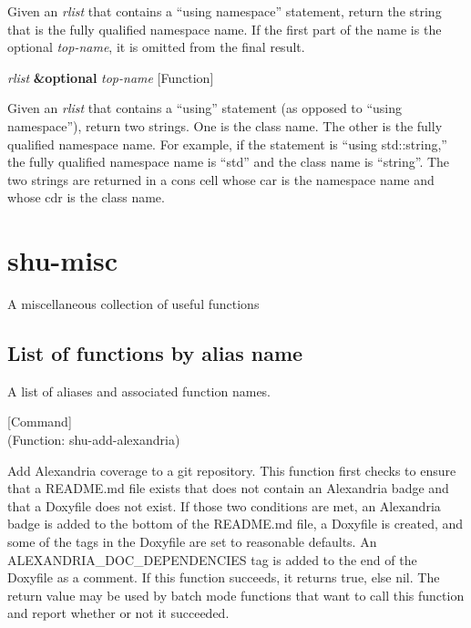 \begin{doc-string}
Given an \emph{rlist} that contains a ``using namespace'' statement, return the string
that is the fully qualified namespace name.  If the first part of the name is the
optional \emph{top-name}, it is omitted from the final result.
\end{doc-string}

\vspace{1em}
\noindent
{}
\usebox{\funcname}\emph{rlist} \textbf{\&optional} \emph{top-name}
 \hfill [Function]

\begin{doc-string}
Given an \emph{rlist} that contains a ``using'' statement (as opposed to ``using
namespace''), return two strings.  One is the class name.  The other is the
fully qualified namespace name.  For example, if the statement is ``using
std::string,'' the fully qualified namespace name is ``std'' and the class name
is ``string''.
The two strings are returned in a cons cell whose car is the namespace name and
whose cdr is the class name.
\end{doc-string}

\eject
\section{shu-misc}



A miscellaneous collection of useful functions


\subsection{List of functions by alias name}

A list of aliases and associated function names.



\vspace{1em}
\noindent
{}
\usebox{\funcname}
 \hfill [Command]\\%
 (Function: shu-add-alexandria)

\begin{doc-string}
Add Alexandria coverage to a git repository.
This function first checks to ensure that a README.md file exists that does not
contain an Alexandria badge and that a Doxyfile does not exist.  If those two
conditions are met, an Alexandria badge is added to the bottom of the README.md
file, a Doxyfile is created, and some of the tags in the Doxyfile are set to
reasonable defaults.  An ALEXANDRIA\_DOC\_DEPENDENCIES tag is added to the end of
the Doxyfile as a comment.
If this function succeeds, it returns true, else nil.  The return value may
be used by batch mode functions that want to call this function and report
whether or not it succeeded.
\end{doc-string}


